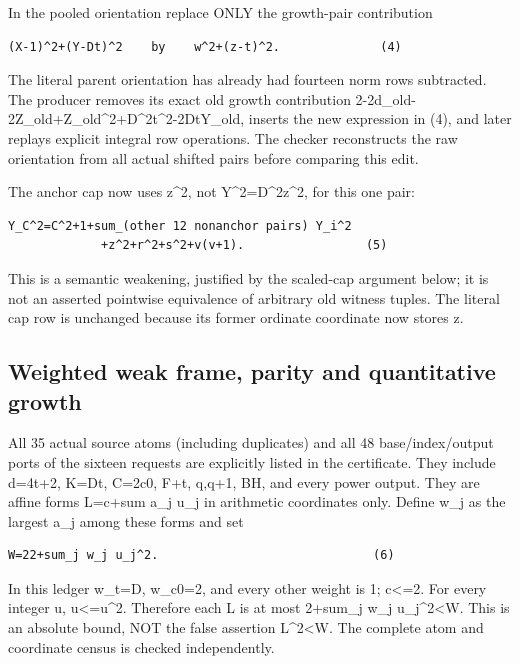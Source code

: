 In the pooled orientation replace ONLY the growth-pair contribution

\begin{verbatim}
(X-1)^2+(Y-Dt)^2    by    w^2+(z-t)^2.              (4)
\end{verbatim}

The literal parent orientation has already had fourteen norm rows
subtracted. The producer removes its exact old growth contribution
2-2d\_old-2Z\_old+Z\_old\^{}2+D\^{}2t\^{}2-2DtY\_old, inserts the new
expression in (4), and later replays explicit integral row operations.
The checker reconstructs the raw orientation from all actual shifted
pairs before comparing this edit.

The anchor cap now uses z\^{}2, not Y\^{}2=D\^{}2z\^{}2, for this one
pair:

\begin{verbatim}
Y_C^2=C^2+1+sum_(other 12 nonanchor pairs) Y_i^2
             +z^2+r^2+s^2+v(v+1).                 (5)
\end{verbatim}

This is a semantic weakening, justified by the scaled-cap argument
below; it is not an asserted pointwise equivalence of arbitrary old
witness tuples. The literal cap row is unchanged because its former
ordinate coordinate now stores z.

\subsection{Weighted weak frame, parity and quantitative
growth}\label{weighted-weak-frame-parity-and-quantitative-growth}

All 35 actual source atoms (including duplicates) and all 48
base/index/output ports of the sixteen requests are explicitly listed in
the certificate. They include d=4t+2, K=Dt, C=2c0, F+t, q,q+1, BH, and
every power output. They are affine forms L=c+sum a\_j u\_j in
arithmetic coordinates only. Define w\_j as the largest
\textbar a\_j\textbar{} among these forms and set

\begin{verbatim}
W=22+sum_j w_j u_j^2.                              (6)
\end{verbatim}

In this ledger w\_t=D, w\_c0=2, and every other weight is 1;
\textbar c\textbar\textless=2. For every integer u,
\textbar u\textbar\textless=u\^{}2. Therefore each \textbar L\textbar{}
is at most 2+sum\_j w\_j u\_j\^{}2\textless W. This is an absolute
bound, NOT the false assertion L\^{}2\textless W. The complete atom and
coordinate census is checked independently.

